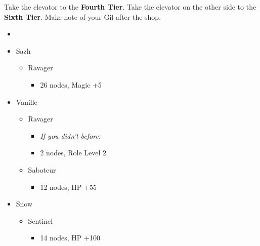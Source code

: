 \begin{multicols}{2}
Take the elevator to the \textbf{Fourth Tier}.
Take the elevator on the other side to the \textbf{Sixth Tier}.
 Make note of your Gil after the shop.
\begin{menu}
\begin{itemize}
    \paradigm
    \begin{itemize}
        \item {}%
{\paradigmline[1]{\textit{\syn}}{\textit{\sab}}{\textit{\rav}}}%
{\paradigmline{\com}{\med}{\com}}%
{\paradigmline{\syn}{\med}{\com}}%
{\paradigmline{\com}{\sab}{\com}}%
{\paradigmline{(\rav)}{\sab}{(\rav)}}%
{\paradigmline{\com}{\rav}{\com}}
    \end{itemize}
    \crystarium
    \begin{itemize}
        \item Sazh
        \begin{itemize}
            \item Ravager
            \begin{itemize}
                \item 26 nodes, Magic +5
            \end{itemize}
        \end{itemize}
        \item Vanille
        \begin{itemize}
            \item Ravager
            \begin{itemize}
                \item \textit{If you didn't before:}
                \item 2 nodes, Role Level 2
            \end{itemize}
            \item Saboteur
            \begin{itemize}
                \item 12 nodes, HP +55
            \end{itemize}
        \end{itemize}
        \item Snow
        \begin{itemize}
            \item Sentinel
            \begin{itemize}
                \item 14 nodes, HP +100
            \end{itemize}
        \end{itemize}

\end{itemize}
\end{itemize}
\end{menu}
\end{multicols}
